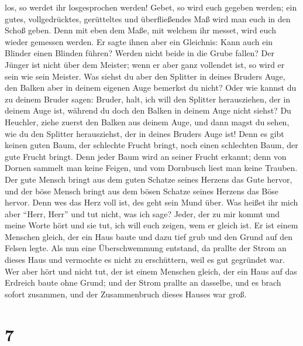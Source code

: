 los, so werdet ihr losgesprochen werden!  Gebet, so wird
euch gegeben werden; ein gutes, vollgedrücktes, gerütteltes und
überfließendes Maß wird man euch in den Schoß geben. Denn mit eben dem
Maße, mit welchem ihr messet, wird euch wieder gemessen werden.
 Er sagte ihnen aber ein Gleichnis: Kann auch ein Blinder
einen Blinden führen? Werden nicht beide in die Grube fallen?
 Der Jünger ist nicht über dem Meister; wenn er aber ganz
vollendet ist, so wird er sein wie sein Meister.  Was
siehst du aber den Splitter in deines Bruders Auge, den Balken aber in
deinem eigenen Auge bemerkst du nicht?  Oder wie kannst
du zu deinem Bruder sagen: Bruder, halt, ich will den Splitter
herausziehen, der in deinem Auge ist, während du doch den Balken in
deinem Auge nicht siehst? Du Heuchler, ziehe zuerst den Balken aus
deinem Auge, und dann magst du sehen, wie du den Splitter herausziehst,
der in deines Bruders Auge ist!  Denn es gibt keinen
guten Baum, der schlechte Frucht bringt, noch einen schlechten Baum, der
gute Frucht bringt.  Denn jeder Baum wird an seiner
Frucht erkannt; denn von Dornen sammelt man keine Feigen, und vom
Dornbusch liest man keine Trauben.  Der gute Mensch
bringt aus dem guten Schatze seines Herzens das Gute hervor, und der
böse Mensch bringt aus dem bösen Schatze seines Herzens das Böse hervor.
Denn wes das Herz voll ist, des geht sein Mund über.  Was
heißet ihr mich aber ``Herr, Herr'' und tut nicht, was ich sage?
 Jeder, der zu mir kommt und meine Worte hört und sie
tut, ich will euch zeigen, wem er gleich ist.  Er ist
einem Menschen gleich, der ein Haus baute und dazu tief grub und den
Grund auf den Felsen legte. Als nun eine Überschwemmung entstand, da
prallte der Strom an dieses Haus und vermochte es nicht zu erschüttern,
weil es gut gegründet war.  Wer aber hört und nicht tut,
der ist einem Menschen gleich, der ein Haus auf das Erdreich baute ohne
Grund; und der Strom prallte an dasselbe, und es brach sofort zusammen,
und der Zusammenbruch dieses Hauses war groß.

\hypertarget{section-6}{%
\section{7}\label{section-6}}


